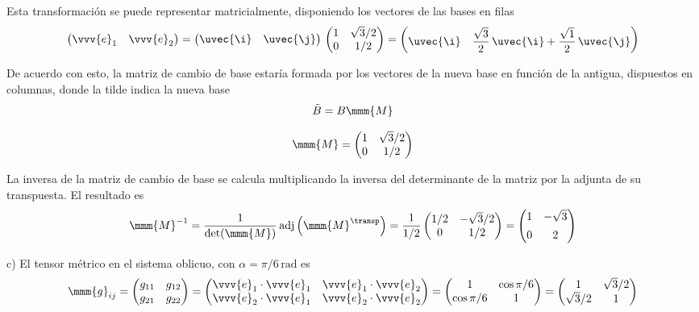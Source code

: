 Esta transformación se puede representar matricialmente, disponiendo los vectores de las
bases en filas
\[
  \begin{pmatrix}
    \vvv{e}_1 & \vvv{e}_2
  \end{pmatrix}
  =
  \begin{pmatrix}
    \uvec{\i} & \uvec{\j}
  \end{pmatrix}
  \,
  \begin{pmatrix}
    1 & \sqrt{3}/2\\
    0 & 1/2
  \end{pmatrix}
  =
  \begin{pmatrix}
    \uvec{\i} & \dfrac{\sqrt{3}}{2}\,\uvec{\i} + \dfrac{\sqrt{1}}{2}\,\uvec{\j}
  \end{pmatrix}
\]

De acuerdo con esto, la matriz de cambio de base estaría formada por los vectores de la
nueva base en función de la antigua, dispuestos en columnas, donde la tilde indica la
nueva base
\[
  \tilde{B} = B \mmm{M}
\]

\[
  \mmm{M}
  = \begin{pmatrix}
    1 & \sqrt{3}/2\\
    0 & 1/2
  \end{pmatrix}
\]

La inversa de la matriz de cambio de base se calcula multiplicando la inversa del
determinante de la matriz por la adjunta de su transpuesta. El resultado es
\[
  \mmm{M}^{-1}
  = \dfrac{1}{\det(\mmm{M})}\,\text{adj}\left(\mmm{M}^\transp\right)
  = \dfrac{1}{1/2}
  \begin{pmatrix}
    1/2 & -\sqrt{3}/2\\
    0 & 1/2
  \end{pmatrix}
  =
  \begin{pmatrix}
    1 & -\sqrt{3}\\[1ex]
    0 & 2
  \end{pmatrix}
\]

\noindent
c) El tensor métrico en el sistema oblicuo, con $\alpha = \pi/6\,\unit{\radian}$ es
\[
  \mmm{g}_{ij}
  =\begin{pmatrix}
    g_{11} & g_{12}\\
    g_{21} & g_{22}
  \end{pmatrix}
  = \begin{pmatrix}
    \vvv{e}_1\cdot\vvv{e}_1 & \vvv{e}_1\cdot\vvv{e}_2\\
    \vvv{e}_2\cdot\vvv{e}_1 & \vvv{e}_2\cdot\vvv{e}_2\\
  \end{pmatrix}
  = \begin{pmatrix}
    1 & \cos\pi/6\\
    \cos\pi/6 & 1
  \end{pmatrix}
  =
  \begin{pmatrix}
    1 & \sqrt{3}/2\\
    \sqrt{3}/2 & 1
  \end{pmatrix}
\]

